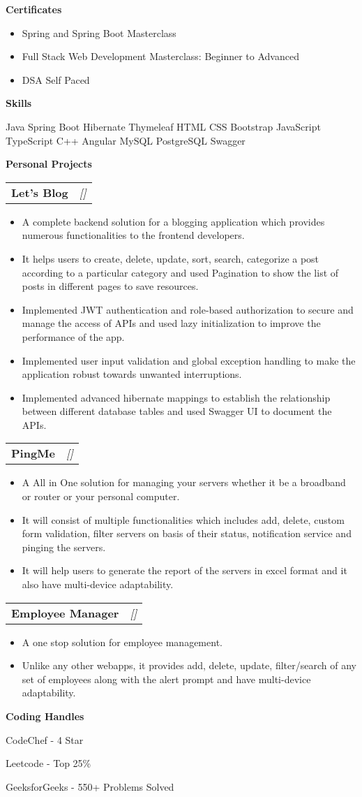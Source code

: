 \documentclass[a4paper,10pt]{article}
\makeatletter
\newcommand{\resitem}[1]{\item #1}
\newcommand{\resheading}[1]{\vspace{0.5em} {\small \colorbox{mygrey}{{\begin{minipage}{0.975\textwidth}{{\textbf{#1}}}\end{minipage}}}} \vspace{0.5em}}
\newcommand{\ressubheading}[3]{\begin{tabular*}{6.62in}{l @{\extracolsep{\fill}} r} \textbf{#1} & \textit{[#2]} \\ \end{tabular*}\vspace{-8pt}}
\makeatother
\begin{document}
\resheading{Certificates}
\begin{itemize}[nosep]
    \resitem{Spring and Spring Boot Masterclass}
    \resitem{Full Stack Web Development Masterclass: Beginner to Advanced}
    \resitem{DSA Self Paced}
\end{itemize}

\resheading{Skills}
\resitem{Java Spring Boot Hibernate Thymeleaf HTML CSS Bootstrap JavaScript TypeScript C++ Angular MySQL PostgreSQL Swagger}

\resheading{Personal Projects}
\ressubheading{Let's Blog}{}{ }
\begin{itemize}[nosep]
    \resitem{A complete backend solution for a blogging application which provides numerous functionalities to the frontend developers.}
    \resitem{It helps users to create, delete, update, sort, search, categorize a post according to a particular category and used Pagination to show the list of posts in different pages to save resources.}
    \resitem{Implemented JWT authentication and role-based authorization to secure and manage the access of APIs and used lazy initialization to improve the performance of the app.}
    \resitem{Implemented user input validation and global exception handling to make the application robust towards unwanted interruptions.}
    \resitem{Implemented advanced hibernate mappings to establish the relationship between different database tables and used Swagger UI to document the APIs.}
\end{itemize}
\ressubheading{PingMe}{}{ }
\begin{itemize}[nosep]
    \resitem{A All in One solution for managing your servers whether it be a broadband or router or your personal computer.}
    \resitem{It will consist of multiple functionalities which includes add, delete, custom form validation, filter servers on basis of their status, notification service and pinging the servers.}
    \resitem{It will help users to generate the report of the servers in excel format and it also have multi-device adaptability.}
\end{itemize}
\ressubheading{Employee Manager}{}{ }
\begin{itemize}[nosep]
    \resitem{A one stop solution for employee management.}
    \resitem{Unlike any other webapps, it provides add, delete, update, filter/search of any set of employees along with the alert prompt and have multi-device adaptability.}
\end{itemize}

\resheading{Coding Handles}
\resitem{CodeChef - 4 Star}
\resitem{Leetcode - Top 25\%}
\resitem{GeeksforGeeks - 550+ Problems Solved}
\end{document}
